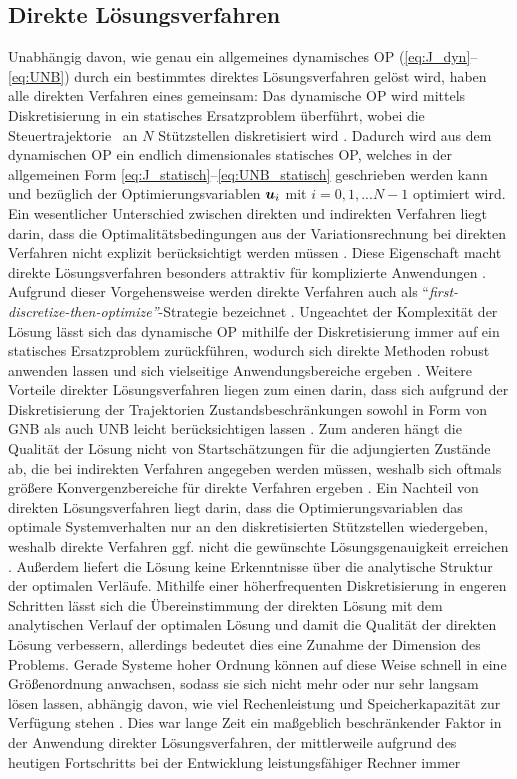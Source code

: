 \subsection{Direkte Lösungsverfahren}\label{subsec:Direkt}
Unabhängig davon, wie genau ein allgemeines dynamisches \gls{OP} (\eqref{eq:J_dyn}--\eqref{eq:UNB}) durch ein bestimmtes direktes Lösungsverfahren gelöst wird, haben alle direkten Verfahren eines gemeinsam: Das dynamische \gls{OP} wird mittels Diskretisierung in ein statisches Ersatzproblem überführt, wobei die Steuertrajektorie \uoft~an $N$ Stützstellen diskretisiert wird \cite{KnutGraichen.2012}. Dadurch wird aus dem dynamischen \gls{OP} ein endlich dimensionales statisches \gls{OP}, welches in der allgemeinen Form \eqref{eq:J_statisch}--\eqref{eq:UNB_statisch} geschrieben werden kann und bezüglich der Optimierungsvariablen $\boldsymbol{u}_i$ mit $i=0,1,...N-1$ optimiert wird. Ein wesentlicher Unterschied zwischen direkten und indirekten Verfahren liegt darin, dass die Optimalitätsbedingungen aus der Variationsrechnung bei direkten Verfahren nicht explizit berücksichtigt werden müssen \cite{Rathgeber.2016}. Diese Eigenschaft macht direkte Lösungsverfahren besonders attraktiv für komplizierte Anwendungen \cite{Betts.1998}. Aufgrund dieser Vorgehensweise werden direkte Verfahren auch als ``\textit{first-discretize-then-optimize''}-Strategie bezeichnet \cite{Papageorgiou.2012}. Ungeachtet der Komplexität der Lösung lässt sich das dynamische \gls{OP} mithilfe der Diskretisierung immer auf ein statisches Ersatzproblem zurückführen, wodurch sich direkte Methoden robust anwenden lassen und sich vielseitige Anwendungsbereiche ergeben \cite{Betts.1998}. Weitere Vorteile direkter Lösungsverfahren liegen zum einen darin, dass sich aufgrund der Diskretisierung der Trajektorien Zustandsbeschränkungen sowohl in Form von \gls{GNB} als auch \gls{UNB} leicht berücksichtigen lassen \cite{KnutGraichen.2012}. Zum anderen hängt die Qualität der Lösung nicht von Startschätzungen für die adjungierten Zustände ab, die bei indirekten Verfahren angegeben werden müssen, weshalb sich oftmals größere Konvergenzbereiche für direkte Verfahren ergeben \cite{KnutGraichen.2012}. Ein Nachteil von direkten Lösungsverfahren liegt darin, dass die Optimierungsvariablen das optimale Systemverhalten nur an den diskretisierten Stützstellen wiedergeben, weshalb direkte Verfahren ggf. nicht die gewünschte Lösungsgenauigkeit erreichen \cite{Papageorgiou.2012}. Außerdem liefert die Lösung keine Erkenntnisse über die analytische Struktur der optimalen Verläufe. Mithilfe einer höherfrequenten Diskretisierung in engeren Schritten lässt sich die Übereinstimmung der direkten Lösung mit dem analytischen Verlauf der optimalen Lösung und damit die Qualität der direkten Lösung verbessern, allerdings bedeutet dies eine Zunahme der Dimension des Problems. Gerade Systeme hoher Ordnung können auf diese Weise schnell in eine Größenordnung anwachsen, sodass sie sich nicht mehr oder nur sehr langsam lösen lassen, abhängig davon, wie viel Rechenleistung und Speicherkapazität zur Verfügung stehen \cite{Papageorgiou.2012}. Dies war lange Zeit ein maßgeblich beschränkender Faktor in der Anwendung direkter Lösungsverfahren, der mittlerweile aufgrund des heutigen Fortschritts bei der Entwicklung leistungsfähiger Rechner immer 